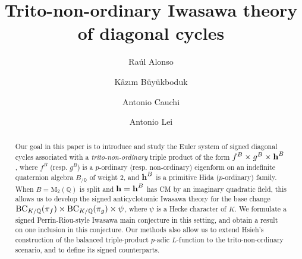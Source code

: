 \documentclass{amsart}
\numberwithin{equation}{section}
\newcommand{\bb}{\mathbb}
\newcommand{\QQ}{\mathbb{Q}}
\newcommand{\h}{\textup{\bf h}}
\begin{document}
\author{Ra\'ul Alonso}
\address{Ra\'ul Alonso\newline UCD School of Mathematics and Statistics\\ University College Dublin\\ Belfield\\Dublin 4\\Ireland}


\author{K\^az\i m B\"uy\"ukboduk}
\address{K\^az\i m B\"uy\"ukboduk\newline UCD School of Mathematics and Statistics\\ University College Dublin\\ Belfield\\Dublin 4\\Ireland}

\author{Antonio Cauchi}
\address{Antonio Cauchi\newline UCD School of Mathematics and Statistics\\ University College Dublin\\ Belfield\\Dublin 4\\Ireland}


\author{Antonio Lei}
\address{Antonio Lei\newline Department of Mathematics and Statistics\\University of Ottawa\\
150 Louis-Pasteur Pvt\\
Ottawa, ON\\
Canada K1N 6N5}

\title{{T}\lowercase{rito}-\lowercase{non-ordinary} I\lowercase{wasawa theory of diagonal cycles}}

\begin{abstract}
Our goal in this paper is to introduce and study the Euler system of signed diagonal cycles associated with a \emph{trito-non-ordinary} triple product of the form $f^B \times g^B \times \h^B$, where $f^B$ (resp. $g^B$) is a $p$-ordinary (resp. non-ordinary) eigenform on an indefinite quaternion algebra $B_{/\QQ}$ of weight $2$, and $\h^B$ is a primitive Hida ($p$-ordinary) family. When $B=\mathrm{M}_2(\bb{Q})$ is split and $\h=\h^B$ has CM by an imaginary quadratic field, this allows us to develop the signed anticyclotomic Iwasawa theory for the base change ${\rm BC}_{K/\QQ}(\pi_f)\times {\rm BC}_{K/\QQ}(\pi_g)\times \psi$, where $\psi$ is a Hecke character of $K$. We formulate a signed Perrin-Riou-style Iwasawa main conjecture in this setting, and obtain a result on one inclusion in this conjecture. Our methods also allow us to extend Hsieh's construction of the balanced triple-product $p$-adic $L$-function to the trito-non-ordinary scenario, and to define its signed counterparts.
\end{abstract}
\end{document}
